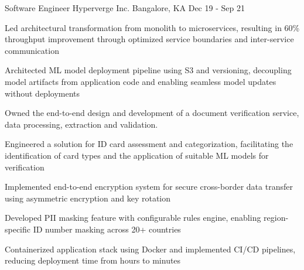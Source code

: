 \begin{cventries}
  \cventry
    {Software Engineer}
    {Hyperverge Inc.}
    {Bangalore, KA}
    {Dec 19  - Sep 21}
    {
      \begin{cvitems}
        \item {Led architectural transformation from monolith to microservices, resulting in 60\% throughput improvement through optimized service boundaries and inter-service communication}
        \item {Architected ML model deployment pipeline using S3 and versioning, decoupling model artifacts from application code and enabling seamless model updates without deployments}
        \item {Owned the end-to-end design and development of a document verification service, data processing, extraction and validation.}
        \item {Engineered a solution for ID card assessment and categorization, facilitating the identification of card types and the application of suitable ML models for verification}
        \item {Implemented end-to-end encryption system for secure cross-border data transfer using asymmetric encryption and key rotation}
        \item {Developed PII masking feature with configurable rules engine, enabling region-specific ID number masking across 20+ countries}
        \item {Containerized application stack using Docker and implemented CI/CD pipelines, reducing deployment time from hours to minutes}
      \end{cvitems}
    }

\end{cventries}
